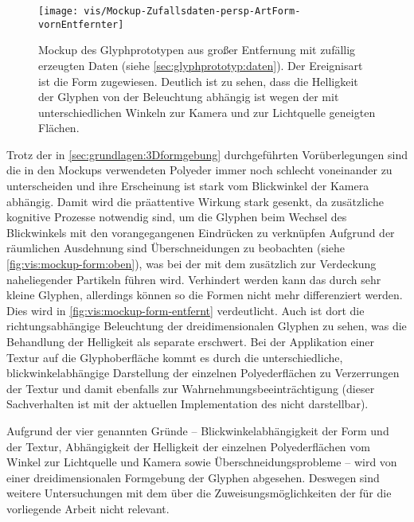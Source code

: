 \begin{figure}
	\texttt{[image: vis/Mockup-Zufallsdaten-persp-ArtForm-vornEntfernter]}
	\caption{Mockup des Glyphprototypen aus großer Entfernung mit zufällig erzeugten Daten (siehe \autoref{sec:glyphprototyp:daten}). Der Ereignisart ist die Form zugewiesen. Deutlich ist zu sehen, dass die Helligkeit der Glyphen von der Beleuchtung abhängig ist wegen der mit unterschiedlichen Winkeln zur Kamera und zur Lichtquelle geneigten Flächen.}\label{fig:vis:mockup-form-entfernt}
\end{figure}

Trotz der in \autoref{sec:grundlagen:3Dformgebung} durchgeführten Vorüberlegungen sind die in den Mockups verwendeten Polyeder immer noch schlecht voneinander zu unterscheiden und ihre Erscheinung ist stark vom Blickwinkel der Kamera abhängig. Damit wird die präattentive Wirkung stark gesenkt, da zusätzliche kognitive Prozesse notwendig sind, um die Glyphen beim Wechsel des Blickwinkels mit den vorangegangenen Eindrücken zu verknüpfen
Aufgrund der räumlichen Ausdehnung sind Überschneidungen zu beobachten (siehe \autoref{fig:vis:mockup-form:oben}), was bei der  mit dem  zusätzlich zur Verdeckung naheliegender Partikeln führen wird. Verhindert werden kann das durch sehr kleine Glyphen, allerdings können so die Formen nicht mehr differenziert werden. Dies wird in \autoref{fig:vis:mockup-form-entfernt} verdeutlicht. Auch ist dort die richtungsabhängige Beleuchtung der dreidimensionalen Glyphen zu sehen, was die Behandlung der Helligkeit als separate  erschwert. Bei der Applikation einer Textur auf die Glyphoberfläche kommt es durch die unterschiedliche, blickwinkelabhängige Darstellung der einzelnen Polyederflächen zu Verzerrungen der Textur und damit ebenfalls zur Wahrnehmungsbeeinträchtigung (dieser Sachverhalten ist mit der aktuellen Implementation des  nicht darstellbar).

Aufgrund der vier genannten Gründe -- Blickwinkelabhängigkeit der Form und der Textur, Abhängigkeit der Helligkeit der einzelnen Polyederflächen vom Winkel zur Lichtquelle und Kamera sowie Überschneidungsprobleme -- wird von einer dreidimensionalen Formgebung der Glyphen abgesehen. Deswegen sind weitere Untersuchungen mit dem  über die Zuweisungsmöglichkeiten der  für die vorliegende Arbeit nicht relevant.

